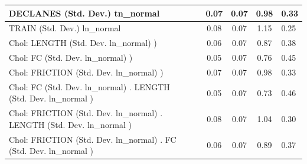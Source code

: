 \begin{table}
\begin{center}
\begin{tabular}{|l|l|c|c|c|l|}
			DECLANES (Std. Dev.) tn_normal &  & 0.07 & 0.07 & 0.98 & 0.33 \\
			\hline
			TRAIN (Std. Dev.) ln_normal &  & 0.08 & 0.07 & 1.15 & 0.25 \\
			\hline
			 Chol: LENGTH (Std. Dev. ln_normal) ) &  & 0.06 & 0.07 & 0.87 & 0.38 \\
			\hline
			 Chol: FC (Std. Dev. ln_normal) ) &  & 0.05 & 0.07 & 0.76 & 0.45 \\
			\hline
			 Chol: FRICTION (Std. Dev. ln_normal) ) &  & 0.07 & 0.07 & 0.98 & 0.33 \\
			\hline
			 Chol: FC (Std. Dev. ln_normal) . LENGTH (Std. Dev.   ln_normal ) &  & 0.05 & 0.07 & 0.73 & 0.46 \\
			\hline
			 Chol: FRICTION (Std. Dev. ln_normal) . LENGTH (Std. Dev.   ln_normal ) &  & 0.08 & 0.07 & 1.04 & 0.30 \\
			\hline
			 Chol: FRICTION (Std. Dev. ln_normal) . FC (Std. Dev.   ln_normal ) &  & 0.06 & 0.07 & 0.89 & 0.37 \\
			\hline
		\end{tabular}
	\end{center}
\end{table}
